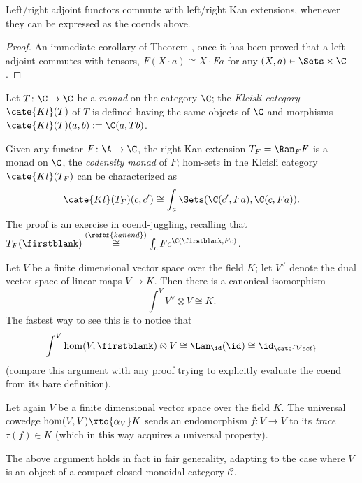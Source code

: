 \begin{proposition}
Left/right adjoint functors commute with left/right Kan extensions, whenever they can be expressed as the coends above.
\end{proposition}
\begin{proof}
An immediate corollary of Theorem , once it has been proved that a left adjoint commutes with tensors, \ie $F(X\cdot a)\cong X\cdot Fa$ for any $(X,a)\in \Sets\times \C$.
\end{proof}
\begin{example}
Let $T\colon \C\to \C$ be a \emph{monad} on the category $\C$; the \emph{Kleisli category} $\cate{Kl}(T)$ of $T$ is defined having the same objects of $\C$ and morphisms $\cate{Kl}(T)(a,b) := \C(a, Tb)$.

Given any functor $F\colon \A\to \C$, the right Kan extension $T_F=\Ran_FF$ is a monad on $\C$, the \emph{codensity monad} of $F$; hom-sets in the Kleisli category $\cate{Kl}(T_F)$ can be characterized as 
\[
\cate{Kl}(T_F)(c,c') \cong \int_a \Sets(\C(c', Fa), \C(c, Fa)).
\]
The proof is an exercise in coend-juggling, recalling that $T_F(\firstblank) \overset{(\refbf{kanend})}\cong \int_c Fc^{\C(\firstblank, Fc)}$.
\end{example}
\begin{example}\label{dualvecspace}
Let $V$ be a finite dimensional vector space over the field $K$; let $V^\lor$ denote the dual vector space of linear maps $V\to K$. Then there is a canonical isomorphism
\[
\int^V V^\lor \otimes V\cong K.
\]
The fastest way to see this is to notice that
\[
\int^V \hom(V,\firstblank)\otimes V\cong \Lan_{\id}(\id)\cong \id_{\cate{Vect}}
\]
(compare this argument with any proof trying to explicitly evaluate the coend from its bare definition).
\end{example}
\begin{remark}
Let again $V$ be a finite dimensional vector space over the field $K$. The universal cowedge $\hom(V,V)\xto{\alpha_V} K$ sends an endomorphism $f\colon V\to V$ to its \emph{trace} $\tau(f)\in K$ (which in this way acquires a universal property).

The above argument holds in fact in fair generality, adapting to the case where $V$ is an object of a compact closed monoidal category $\mathcal{C}$.
\end{remark}

